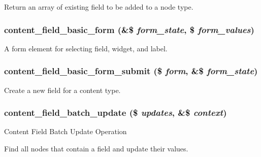 Return an array of existing field to be added to a node type. \hypertarget{content_8admin_8inc_cb416904beef692371c3dd7fc0ea292e}{
\subsubsection[{content\_\-field\_\-basic\_\-form}]{\setlength{\rightskip}{0pt plus 5cm}content\_\-field\_\-basic\_\-form (\&\$ {\em form\_\-state}, \/  \$ {\em form\_\-values})}}
\label{content_8admin_8inc_cb416904beef692371c3dd7fc0ea292e}


A form element for selecting field, widget, and label. \hypertarget{content_8admin_8inc_dd47be7ac19d3582f71bfd66c65bb95b}{
\subsubsection[{content\_\-field\_\-basic\_\-form\_\-submit}]{\setlength{\rightskip}{0pt plus 5cm}content\_\-field\_\-basic\_\-form\_\-submit (\$ {\em form}, \/  \&\$ {\em form\_\-state})}}
\label{content_8admin_8inc_dd47be7ac19d3582f71bfd66c65bb95b}


Create a new field for a content type. \hypertarget{content_8admin_8inc_d1be9f73d417ae00aab3a76a98adfc9d}{
\subsubsection[{content\_\-field\_\-batch\_\-update}]{\setlength{\rightskip}{0pt plus 5cm}content\_\-field\_\-batch\_\-update (\$ {\em updates}, \/  \&\$ {\em context})}}
\label{content_8admin_8inc_d1be9f73d417ae00aab3a76a98adfc9d}


Content Field Batch Update Operation

Find all nodes that contain a field and update their values.

